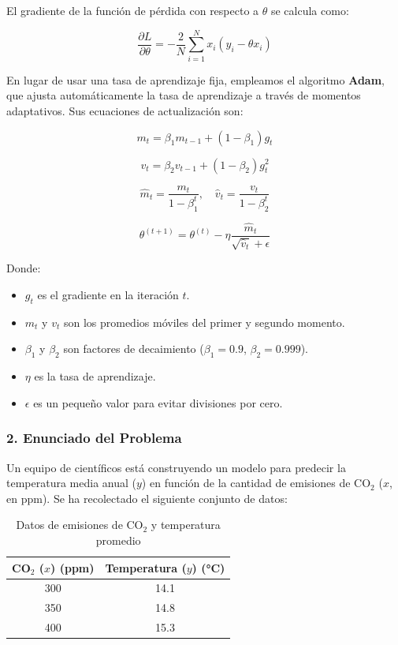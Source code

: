 \documentclass[a5paper]{article}
\begin{document}
	El gradiente de la función de pérdida con respecto a \( \theta \) se calcula como:
	
	\[
	\frac{\partial L}{\partial \theta} = -\frac{2}{N} \sum_{i=1}^{N} x_i (y_i - \theta x_i)
	\]
	
	En lugar de usar una tasa de aprendizaje fija, empleamos el algoritmo \textbf{Adam}, que ajusta automáticamente la tasa de aprendizaje a través de momentos adaptativos. Sus ecuaciones de actualización son:
	
	\[
	m_t = \beta_1 m_{t-1} + (1 - \beta_1) g_t
	\]
	
	\[
	v_t = \beta_2 v_{t-1} + (1 - \beta_2) g_t^2
	\]
	
	\[
	\hat{m}_t = \frac{m_t}{1 - \beta_1^t}, \quad \hat{v}_t = \frac{v_t}{1 - \beta_2^t}
	\]
	
	\[
	\theta^{(t+1)} = \theta^{(t)} - \eta \frac{\hat{m}_t}{\sqrt{\hat{v}_t} + \epsilon}
	\]
	
	Donde:
	\begin{itemize}
		\item \( g_t \) es el gradiente en la iteración \( t \).
		\item \( m_t \) y \( v_t \) son los promedios móviles del primer y segundo momento.
		\item \( \beta_1 \) y \( \beta_2 \) son factores de decaimiento (\( \beta_1 = 0.9 \), \( \beta_2 = 0.999 \)).
		\item \( \eta \) es la tasa de aprendizaje.
		\item \( \epsilon \) es un pequeño valor para evitar divisiones por cero.
	\end{itemize}
	
	\subsubsection*{2. Enunciado del Problema}
	
	Un equipo de científicos está construyendo un modelo para predecir la temperatura media anual (\( y \)) en función de la cantidad de emisiones de CO$_{2}$ (\( x \), en ppm). Se ha recolectado el siguiente conjunto de datos:
	
	\begin{table}[h]
		\centering
		\begin{tabular}{|c|c|}
			\hline
			CO$_{2}$ (\( x \)) (ppm) & Temperatura (\( y \)) (°C) \\
			\hline
			300 & 14.1 \\
			350 & 14.8 \\
			400 & 15.3 \\
			\hline
		\end{tabular}
		\caption{Datos de emisiones de CO$_{2}$ y temperatura promedio}
	\end{table}
	
\end{document}

